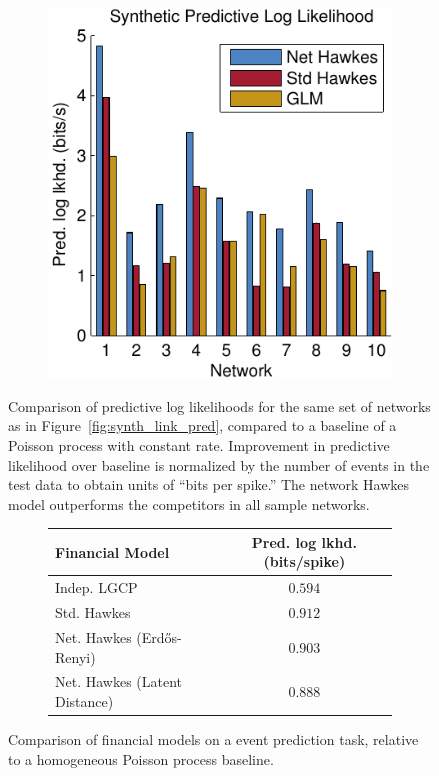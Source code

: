 \begin{figure}[t]
\begin{center}
\begin{subfigure}[T]{\linewidth}
\begin{center}
\includegraphics[width=.6\linewidth]{figures/ch2/synth_pred_ll} 
\end{center}
\end{subfigure}
\end{center}
\vspace{-1em}
\caption{Comparison of predictive log likelihoods for the same set of networks as in Figure~\ref{fig:synth_link_pred}, compared to a baseline of a Poisson process with constant rate. Improvement in predictive likelihood over baseline is normalized by the number of events in the test data to obtain units of ``bits per spike.'' The network Hawkes model outperforms the competitors in all sample networks.}
\label{fig:synth_pred_ll}
\vspace{-1.5em}
\end{figure}

\begin{figure}[!b]
\vspace{-1em}
\begin{subfigure}[T]{\linewidth}
\begin{small}
\begin{tabular}{|l|c|}
\hline
\textbf{Financial Model} & \textbf{Pred. log lkhd. (bits/spike)} \\
\hline
Indep. LGCP & $0.594$ \\
Std. Hawkes & $0.912$ \\
Net. Hawkes (Erd\H{o}s-Renyi) & $0.903$ \\
Net. Hawkes (Latent Distance) & $0.888$ \\
\hline
\end{tabular}
\end{small}
\end{subfigure}
\vspace{-.5em}
\caption{Comparison of financial models on a event prediction task, relative to a homogeneous Poisson process baseline.}
\label{fig:financial_pred_ll}
\end{figure}

